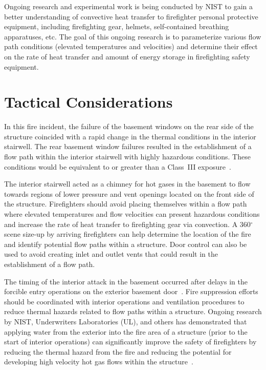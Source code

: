 \documentclass[12pt,oneside]{book}
\begin{document}
Ongoing research and experimental work is being conducted by NIST to gain a better understanding of convective heat transfer to firefighter personal protective equipment, including firefighting gear, helmets, self-contained breathing apparatuses, etc. The goal of this ongoing research is to parameterize various flow path conditions (elevated temperatures and velocities) and determine their effect on the rate of heat transfer and amount of energy storage in firefighting safety equipment.


\clearpage


\section{Tactical Considerations}
\label{sec:tactical_considerations}

In this fire incident, the failure of the basement windows on the rear side of the structure coincided with a rapid change in the thermal conditions in the interior stairwell. The rear basement window failures resulted in the establishment of a flow path within the interior stairwell with highly hazardous conditions. These conditions would be equivalent to or greater than a Class~III exposure~\cite{Donnelly2006}.

The interior stairwell acted as a chimney for hot gases in the basement to flow towards regions of lower pressure and vent openings located on the front side of the structure. Firefighters should avoid placing themselves within a flow path where elevated temperatures and flow velocities can present hazardous conditions and increase the rate of heat transfer to firefighting gear via convection. A 360$^\circ$ scene size-up by arriving firefighters can help determine the location of the fire and identify potential flow paths within a structure. Door control can also be used to avoid creating inlet and outlet vents that could result in the establishment of a flow path.

The timing of the interior attack in the basement occurred after delays in the forcible entry operations on the exterior basement door~\cite{NIOSH:Bowyer2}. Fire suppression efforts should be coordinated with interior operations and ventilation procedures to reduce thermal hazards related to flow paths within a structure. Ongoing research by NIST, Underwriters Laboratories (UL), and others has demonstrated that applying water from the exterior into the fire area of a structure (prior to the start of interior operations) can significantly improve the safety of firefighters by reducing the thermal hazard from the fire and reducing the potential for developing high velocity hot gas flows within the structure~\cite{madrzykowski2009fire, kerber2009fire}.
\end{document}
